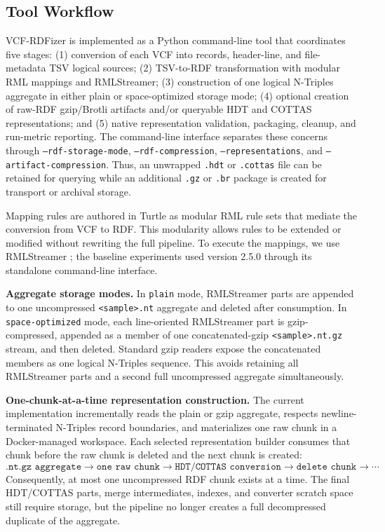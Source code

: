 \documentclass[pdflatex,sn-mathphys-num]{sn-jnl}%
\newenvironment{revision}{\begingroup\color{revisionblue}}{\endgroup}%
\theoremstyle{thmstyleone}%
\theoremstyle{thmstyletwo}%
\theoremstyle{thmstylethree}%
\begin{document}
\subsection{Tool Workflow}\label{subsec2.2}
\begin{revision}
VCF-RDFizer is implemented as a Python command-line tool that coordinates five stages: 
(1) conversion of each VCF into records, header-line, and file-metadata TSV logical sources; 
(2) TSV-to-RDF transformation with modular RML mappings and RMLStreamer; 
(3) construction of one logical N-Triples aggregate in either plain or space-optimized storage mode; 
(4) optional creation of raw-RDF gzip/Brotli artifacts and/or queryable HDT and COTTAS representations; and 
(5) native representation validation, packaging, cleanup, and run-metric reporting. 
The command-line interface separates these concerns through \texttt{--rdf-storage-mode}, \texttt{--rdf-compression}, \texttt{--representations}, and \texttt{--artifact-compression}. Thus, an unwrapped \texttt{.hdt} or \texttt{.cottas} file can be retained for querying while an additional \texttt{.gz} or \texttt{.br} package is created for transport or archival storage.

Mapping rules are authored in Turtle as modular RML rule sets that mediate the conversion from VCF to RDF. 
This modularity allows rules to be extended or modified without rewriting the full pipeline. 
To execute the mappings, we use RMLStreamer \cite{rmlstreamer_2022}; the baseline experiments used version 2.5.0 through its standalone command-line interface.

\textbf{Aggregate storage modes.}
In \texttt{plain} mode, RMLStreamer parts are appended to one uncompressed \texttt{<sample>.nt} aggregate and deleted after consumption. 
In \texttt{space-optimized} mode, each line-oriented RMLStreamer part is gzip-compressed, appended as a member of one concatenated-gzip \texttt{<sample>.nt.gz} stream, and then deleted. Standard gzip readers expose the concatenated members as one logical N-Triples sequence. This avoids retaining all RMLStreamer parts and a second full uncompressed aggregate simultaneously.

\textbf{One-chunk-at-a-time representation construction.}
The current implementation incrementally reads the plain or gzip aggregate, respects newline-terminated N-Triples record boundaries, and materializes one raw chunk in a Docker-managed workspace. Each selected representation builder consumes that chunk before the raw chunk is deleted and the next chunk is created:
\[
\texttt{.nt.gz aggregate} \rightarrow \texttt{one raw chunk} \rightarrow \texttt{HDT/COTTAS conversion} \rightarrow \texttt{delete chunk} \rightarrow \cdots
\]
Consequently, at most one uncompressed RDF chunk exists at a time. The final HDT/COTTAS parts, merge intermediates, indexes, and converter scratch space still require storage, but the pipeline no longer creates a full decompressed duplicate of the aggregate.


\end{revision}
\end{document}
